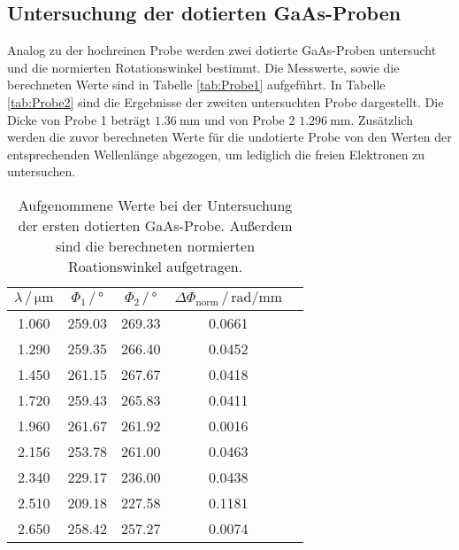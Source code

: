    \subsection{Untersuchung der dotierten GaAs-Proben}
   Analog zu der hochreinen Probe werden zwei dotierte GaAs-Proben untersucht und die normierten Rotationswinkel
   bestimmt. Die Messwerte, sowie die berechneten Werte sind in Tabelle \ref{tab:Probe1} aufgeführt.
   In Tabelle \ref{tab:Probe2} sind die Ergebnisse der zweiten untersuchten Probe dargestellt. Die Dicke
   von Probe 1 beträgt $\SI{1.36}{\milli\meter}$ und von Probe 2 $\SI{1.296}{\milli\meter}$. Zusätzlich
   werden die zuvor berechneten Werte für die undotierte Probe von den Werten der entsprechenden Wellenlänge
   abgezogen, um lediglich die freien Elektronen zu untersuchen.
   \begin{table}[H]
    \centering
    \caption{Aufgenommene Werte bei der Untersuchung der ersten dotierten GaAs-Probe. Außerdem sind die
    berechneten normierten Roationswinkel aufgetragen.}
    \label{tab:tab:Probe1}
    \begin{tabular}{ccccc}
      \toprule
      $\lambda\, / \, \si{\micro\meter}$ & $\Phi_1 \, / \, \si{\degree}$ & $\Phi_2 \, / \, \si{\degree}$ & $\Delta\Phi_\text{norm} \, / \, \si{\radian\per\milli\meter}$  \\
      \midrule
      \num{1.060} & \num{259.03} & \num{269.33} & \num{0.0661}  \\
      \num{1.290} & \num{259.35} & \num{266.40} & \num{0.0452}  \\
      \num{1.450} & \num{261.15} & \num{267.67} & \num{0.0418}  \\
      \num{1.720} & \num{259.43} & \num{265.83} & \num{0.0411}  \\
      \num{1.960} & \num{261.67} & \num{261.92} & \num{0.0016}  \\
      \num{2.156} & \num{253.78} & \num{261.00} & \num{0.0463}  \\
      \num{2.340} & \num{229.17} & \num{236.00} & \num{0.0438}  \\
      \num{2.510} & \num{209.18} & \num{227.58} & \num{0.1181}  \\
      \num{2.650} & \num{258.42} & \num{257.27} & \num{0.0074}  \\
      \bottomrule
    \end{tabular}
   \end{table} \noindent

